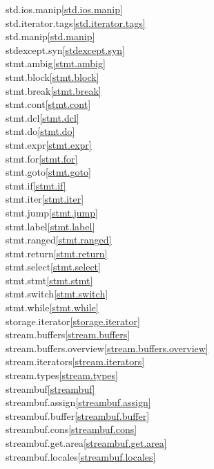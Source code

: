 \begin{multicols}{2}
std.ios.manip\quad\ref{std.ios.manip}\\
std.iterator.tags\quad\ref{std.iterator.tags}\\
std.manip\quad\ref{std.manip}\\
stdexcept.syn\quad\ref{stdexcept.syn}\\
stmt.ambig\quad\ref{stmt.ambig}\\
stmt.block\quad\ref{stmt.block}\\
stmt.break\quad\ref{stmt.break}\\
stmt.cont\quad\ref{stmt.cont}\\
stmt.dcl\quad\ref{stmt.dcl}\\
stmt.do\quad\ref{stmt.do}\\
stmt.expr\quad\ref{stmt.expr}\\
stmt.for\quad\ref{stmt.for}\\
stmt.goto\quad\ref{stmt.goto}\\
stmt.if\quad\ref{stmt.if}\\
stmt.iter\quad\ref{stmt.iter}\\
stmt.jump\quad\ref{stmt.jump}\\
stmt.label\quad\ref{stmt.label}\\
stmt.ranged\quad\ref{stmt.ranged}\\
stmt.return\quad\ref{stmt.return}\\
stmt.select\quad\ref{stmt.select}\\
stmt.stmt\quad\ref{stmt.stmt}\\
stmt.switch\quad\ref{stmt.switch}\\
stmt.while\quad\ref{stmt.while}\\
storage.iterator\quad\ref{storage.iterator}\\
stream.buffers\quad\ref{stream.buffers}\\
stream.buffers.overview\quad\ref{stream.buffers.overview}\\
stream.iterators\quad\ref{stream.iterators}\\
stream.types\quad\ref{stream.types}\\
streambuf\quad\ref{streambuf}\\
streambuf.assign\quad\ref{streambuf.assign}\\
streambuf.buffer\quad\ref{streambuf.buffer}\\
streambuf.cons\quad\ref{streambuf.cons}\\
streambuf.get.area\quad\ref{streambuf.get.area}\\
streambuf.locales\quad\ref{streambuf.locales}\\

\end{multicols}
